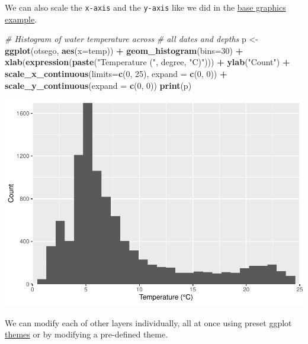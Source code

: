 \documentclass[
]{book}
\newenvironment{Shaded}{\begin{snugshade}}{\end{snugshade}}
\newcommand{\CommentTok}[1]{\textcolor[rgb]{0.56,0.35,0.01}{\textit{#1}}}
\newcommand{\DataTypeTok}[1]{\textcolor[rgb]{0.13,0.29,0.53}{#1}}
\newcommand{\DecValTok}[1]{\textcolor[rgb]{0.00,0.00,0.81}{#1}}
\newcommand{\KeywordTok}[1]{\textcolor[rgb]{0.13,0.29,0.53}{\textbf{#1}}}
\newcommand{\NormalTok}[1]{#1}
\newcommand{\OperatorTok}[1]{\textcolor[rgb]{0.81,0.36,0.00}{\textbf{#1}}}
\newcommand{\StringTok}[1]{\textcolor[rgb]{0.31,0.60,0.02}{#1}}
\begin{document}
We can also scale the \texttt{x-axis} and the \texttt{y-axis} like we did in the \protect\hyperlink{histograms}{base graphics example}.

\begin{Shaded}
\begin{Highlighting}[]
\CommentTok{# Histogram of water temperature across }
\CommentTok{# all dates and depths}
\NormalTok{p <-}\StringTok{ }\KeywordTok{ggplot}\NormalTok{(otsego, }\KeywordTok{aes}\NormalTok{(}\DataTypeTok{x=}\NormalTok{temp)) }\OperatorTok{+}\StringTok{ }
\StringTok{  }\KeywordTok{geom_histogram}\NormalTok{(}\DataTypeTok{bins=}\DecValTok{30}\NormalTok{) }\OperatorTok{+}\StringTok{ }
\StringTok{  }\KeywordTok{xlab}\NormalTok{(}\KeywordTok{expression}\NormalTok{(}\KeywordTok{paste}\NormalTok{(}\StringTok{"Temperature ("}\NormalTok{, degree, }\StringTok{"C)"}\NormalTok{))) }\OperatorTok{+}
\StringTok{  }\KeywordTok{ylab}\NormalTok{(}\StringTok{"Count"}\NormalTok{) }\OperatorTok{+}
\StringTok{  }\KeywordTok{scale_x_continuous}\NormalTok{(}\DataTypeTok{limits=}\KeywordTok{c}\NormalTok{(}\DecValTok{0}\NormalTok{, }\DecValTok{25}\NormalTok{), }\DataTypeTok{expand =} \KeywordTok{c}\NormalTok{(}\DecValTok{0}\NormalTok{, }\DecValTok{0}\NormalTok{)) }\OperatorTok{+}\StringTok{ }
\StringTok{  }\KeywordTok{scale_y_continuous}\NormalTok{(}\DataTypeTok{expand =} \KeywordTok{c}\NormalTok{(}\DecValTok{0}\NormalTok{, }\DecValTok{0}\NormalTok{))}
\KeywordTok{print}\NormalTok{(p)}
\end{Highlighting}
\end{Shaded}

\includegraphics{worstr_files/figure-latex/unnamed-chunk-101-1.pdf}

We can modify each of other layers individually, all at once using preset ggplot \href{http://www.sthda.com/english/wiki/ggplot2-title-main-axis-and-legend-titles}{themes} or by modifying a pre-defined theme.
\end{document}
